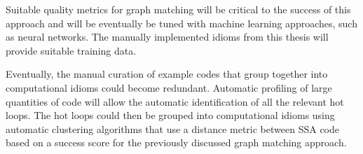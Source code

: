     Suitable quality metrics for graph matching will be critical to the success
    of this approach and will be eventually be tuned with machine learning
    approaches, such as neural networks.
    The manually implemented idioms from this thesis will provide suitable
    training data.

    Eventually, the manual curation of example codes that group together into
    computational idioms could become redundant.
    Automatic profiling of large quantities of code will allow the automatic
    identification of all the relevant hot loops.
    The hot loops could then be grouped into computational idioms using
    automatic clustering algorithms that use a distance metric between SSA code
    based on a success score for the previously discussed graph matching
    approach.
